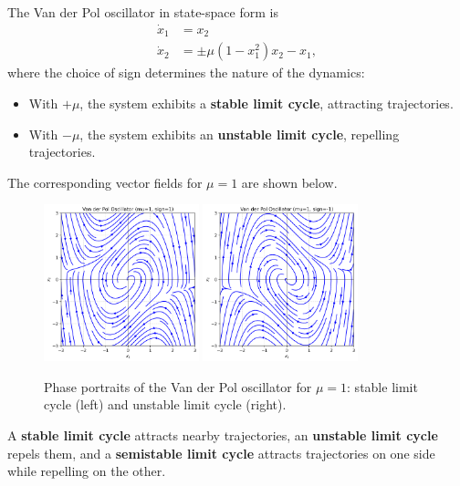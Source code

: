 \begin{example}
    The Van der Pol oscillator in state-space form is
    \begin{align}
        \dot{x}_1 &= x_2 \\
        \dot{x}_2 &= \pm \mu (1-x_1^2)x_2 - x_1,
    \end{align}
    where the choice of sign determines the nature of the dynamics:
    \begin{itemize}
        \item With $+\mu$, the system exhibits a \textbf{stable limit cycle}, attracting trajectories.  
        \item With $-\mu$, the system exhibits an \textbf{unstable limit cycle}, repelling trajectories.  
    \end{itemize}

    The corresponding vector fields for $\mu=1$ are shown below.

    \begin{figure}[h!]
        \centering
        \includegraphics[width=0.4\textwidth]{Images/nonlinear/introduction/vdp_stable.png}
        \includegraphics[width=0.4\textwidth]{Images/nonlinear/introduction/vdp_unstable.png}
        \caption{Phase portraits of the Van der Pol oscillator for $\mu=1$: stable limit cycle (left) and unstable limit cycle (right).}
    \end{figure}
\end{example}


\begin{remark}
A \textbf{stable limit cycle} attracts nearby trajectories, an \textbf{unstable limit cycle} repels them, and a \textbf{semistable limit cycle} attracts trajectories on one side while repelling on the other. 
\end{remark}

